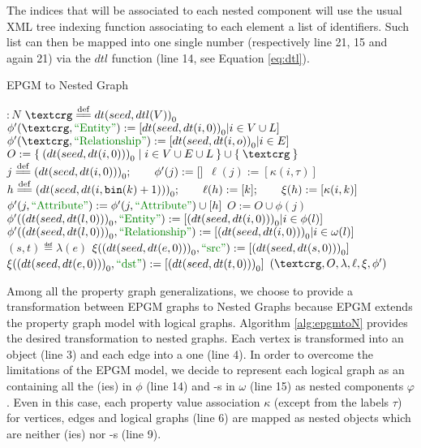  The indices that will be associated to each nested component will use the usual XML tree indexing function \cite{Liu16} associating to each element a list of identifiers. Such list can then be mapped into one single number (respectively line 21, 15 and again 21) via the $dtl$ function (line 14, see Equation \vref{eq:dtl}). 

\begin{algorithm}[!t]
	\caption{EPGM to Nested Graph}\label{alg:epgmtoN}
	{
		\begin{minipage}{\linewidth}
			\begin{algorithmic}[1]
				 $\colon N$ 
				\State $\ngraph \eqdef {dt(seed,dtl(V))}_0$
				\State $\phi'(\ngraph,\ONTA):=[{dt(seed,dt(i,0))}_0|i\in V\cup L]$
				\State $\phi'(\ngraph,\RELA):=[{dt(seed,dt(i,o))}_0|i\in E]$
				\State $O:= \Set{\zsed{dt(seed,dt(i, 0))}|i\in V\cup E\cup L}\cup\Set{\ngraph}$
				\State $j \overset{\mathrm{def}}{=\mathrel{\mkern-3mu}=} {(dt(seed,dt(i,0)))}_0;\qquad \phi'(j):=[]$
				\State $\ell(j):=[\kappa(i,\tau)]$
				\State $h \overset{\mathrm{def}}{=\mathrel{\mkern-3mu}=} {(dt(seed,dt(i,\texttt{bin}(k)+1)))}_0;\qquad \ell(h):=[k];\qquad \xi(h):=[\kappa(i,k)]$
				\State $\phi'(j,\ATTR):=\phi'(j,\ATTR)\cup[h]$
				\EndFor
				\State $O:=O\cup \phi(j)$
				\EndFor
				\State $\phi'(\zsed{dt(seed,dt(l,0))},\ONTA):=[\zsed{dt(seed,dt(i,0))}|i\in\phi(l)]$
				\State $\phi'(\zsed{dt(seed,dt(l,0))},\RELA):=[\zsed{dt(seed,dt(i,0))}|i\in\omega(l)]$
				\EndFor
				\State $(s,t)\eqdef \lambda(e)$
				\State $\xi(\zsed{dt(seed,dt(e,0))},\SRC):=[\zsed{dt(seed,dt(s,0))}]$
				\State $\xi(\zsed{dt(seed,dt(e,0))},\DST):=[\zsed{dt(seed,dt(t,0))}]$
				\EndFor
				\State \Return $(\ngraph,O,\lambda,\ell,\xi,\phi')$
				\EndFunction
			\end{algorithmic}
	\end{minipage}}
\end{algorithm}
Among all the property graph generalizations, we choose to provide a transformation between EPGM graphs to Nested Graphs because EPGM extends the property graph model with logical graphs. Algorithm \vref{alg:epgmtoN} provides the desired transformation to nested graphs. Each vertex is transformed into an \ONTA  object (line 3) and each edge into a \RELA one (line 4). In order to overcome the limitations of the EPGM model, we decide to represent each logical graph as an \ONTA containing all the \ONTA(ies) in $\phi$ (line 14) and \RELA-s in $\omega$ (line 15) as nested components $\varphi$. Even in this case, each property value association $\kappa$ (except from the labels $\tau$) for vertices, edges and logical graphs (line 6) are mapped as nested objects which are neither \ONTA(ies) nor \RELA-s (line 9). 
